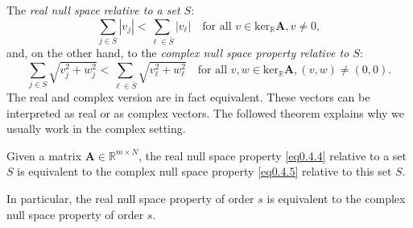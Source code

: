 The \emph{\textcolor[rgb]{1,0,0}{real null space relative to a set $S$}}:
\begin{equation}
    \sum\limits_{j \in S} \left|v_j\right| < \sum\limits_{\ell \in \bar{S}} \left|v_{\ell}\right| \quad \text{for all } v \in \text{ker}_{\mathbb{R}} \mathbf{A}, v \neq 0,
    \label{eq0.4.4}
\end{equation}
and, on the other hand, to the \emph{\textcolor[rgb]{1,0,0}{complex null space property relative to $S$}}:
\begin{equation}
    \sum\limits_{j \in S} \sqrt{v_j^2 + w_j^2} < \sum\limits_{\ell \in \bar{S}} \sqrt{v_{\ell}^2 + w_{\ell}^2} \quad \text{for all } v,w \in \text{ker}_{\mathbb{R}} \mathbf{A},(v,w) \neq (0,0).
    \label{eq0.4.5}
\end{equation}
The real and complex version are in fact equivalent. These vectors can be interpreted as real or as complex vectors. The followed theorem explains why we usually work in the complex setting.
\begin{theorem}
    \label{th0.4.7}
    Given a matrix $\mathbf{A} \in \mathbb{R}^{m\times N}$, the real null space property \cref{eq0.4.4} relative to a set $S$ is equivalent to the complex null space property \cref{eq0.4.5} relative to this set $S$.

    In particular, the real null space property of order $s$ is equivalent to the complex null space property of order $s$.
\end{theorem}

